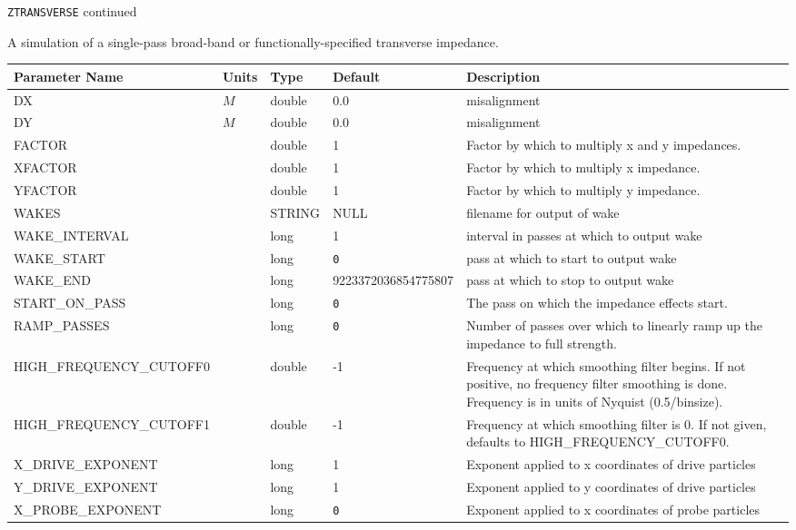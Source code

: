 \newpage
\begin{center}{\Large\verb|ZTRANSVERSE| continued}\end{center}
A simulation of a single-pass broad-band or functionally-specified transverse impedance.
\\
\begin{tabular}{|l|l|l|l|p{\descwidth}|} \hline
Parameter Name & Units & Type & Default & Description \\ \hline 
DX & $M$ & double &  0.0 & misalignment  \\ \hline 
DY & $M$ & double &  0.0 & misalignment  \\ \hline 
FACTOR &  & double &   1 & Factor by which to multiply x and y impedances.  \\ \hline 
XFACTOR &  & double &   1 & Factor by which to multiply x impedance.  \\ \hline 
YFACTOR &  & double &   1 & Factor by which to multiply y impedance.  \\ \hline 
WAKES &  & STRING &   NULL            & filename for output of wake  \\ \hline 
WAKE\_INTERVAL &  & long &   1               & interval in passes at which to output wake  \\ \hline 
WAKE\_START &  & long &  \verb|0| & pass at which to start to output wake  \\ \hline 
WAKE\_END &  & long &   9223372036854775807 & pass at which to stop to output wake  \\ \hline 
START\_ON\_PASS &  & long &  \verb|0| & The pass on which the impedance effects start.  \\ \hline 
RAMP\_PASSES &  & long &  \verb|0| & Number of passes over which to linearly ramp up the impedance to full strength.  \\ \hline 
HIGH\_FREQUENCY\_CUTOFF0 &  & double &   -1 & Frequency at which smoothing filter begins.  If not positive, no frequency filter smoothing is done.  Frequency is in units of Nyquist (0.5/binsize).  \\ \hline 
HIGH\_FREQUENCY\_CUTOFF1 &  & double &   -1 & Frequency at which smoothing filter is 0.  If not given, defaults to HIGH\_FREQUENCY\_CUTOFF0.  \\ \hline 
X\_DRIVE\_EXPONENT &  & long &   1               & Exponent applied to x coordinates of drive particles  \\ \hline 
Y\_DRIVE\_EXPONENT &  & long &   1               & Exponent applied to y coordinates of drive particles  \\ \hline 
X\_PROBE\_EXPONENT &  & long &  \verb|0| & Exponent applied to x coordinates of probe particles  \\ \hline 
\end{tabular}

